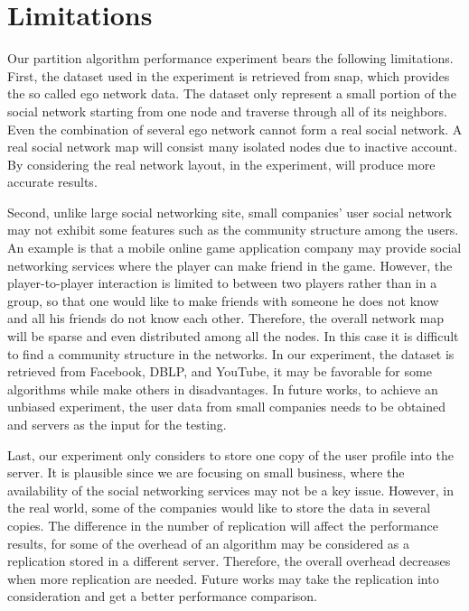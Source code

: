 \section{Limitations}

Our partition algorithm performance experiment bears the following limitations.
First, the dataset used in the experiment is retrieved from snap, which provides the so called ego network data. The dataset only represent a small portion of the social network starting from one node and traverse through all of its neighbors. Even the combination of several ego network cannot form a real social network. A real social network map will consist many isolated nodes due to inactive account. By considering the real network layout, in the experiment, will produce more accurate results. 

Second, unlike large social networking site, small companies’ user social network may not exhibit some features such as the community structure among the users. An example is that a mobile online game application company may provide social networking services where the player can make friend in the game. However, the player-to-player interaction is limited to between two players rather than in a group, so that one would like to make friends with someone he does not know and all his friends do not know each other. Therefore, the overall network map will be sparse and even distributed among all the nodes. In this case it is difficult to find a community structure in the networks. In our experiment, the dataset is retrieved from Facebook, DBLP, and YouTube, it may be favorable for some algorithms while make others in disadvantages. In future works, to achieve an unbiased experiment, the user data from small companies needs to be obtained and servers as the input for the testing.

Last, our experiment only considers to store one copy of the user profile into the server.  It is plausible since we are focusing on small business, where the availability of the social networking services may not be a key issue. However, in the real world, some of the companies would like to store the data in several copies. The difference in the number of replication will affect the performance results, for some of the overhead of an algorithm may be considered as a replication stored in a different server. Therefore, the overall overhead decreases when more replication are needed. Future works may take the replication into consideration and get a better performance comparison. 